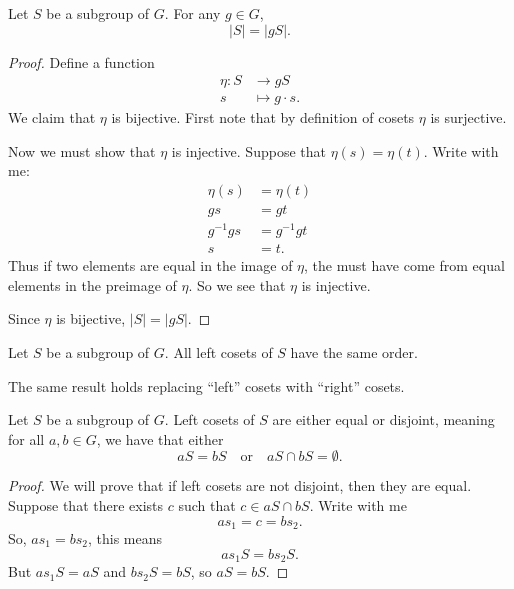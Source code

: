 \documentclass{ximera}
\begin{document}
\begin{lemma}\label{P:CSG}
  Let $S$ be a subgroup of $G$. For any $g\in G$,
  \[
  |S| = |gS|.
  \]
  \begin{proof}
    Define a function
    \begin{align*}
      \eta: S &\to g S\\
      s &\mapsto g\cdot s.
    \end{align*}
    We claim that $\eta$ is bijective. First note that by definition
    of cosets $\eta$ is surjective.

    Now we must show that $\eta$ is injective. Suppose that $\eta(s) =
    \eta(t)$. Write with me:
    \begin{align*}
      \eta(s) &= \eta(t) \\
      gs &= gt\\
      g^{-1} g s &= g^{-1} g t\\
      s &= t.
    \end{align*}
    Thus if two elements are equal in the image of $\eta$, the must
    have come from equal elements in the preimage of $\eta$. So we see
    that $\eta$ is injective.

    Since $\eta$ is bijective, $|S|= |gS|$.
  \end{proof}
\end{lemma}

\begin{corollary}
  Let $S$ be a subgroup of $G$. All left cosets of $S$ have the same
  order.
\end{corollary}

\begin{remark}
  The same result holds replacing ``left'' cosets with ``right''
  cosets.
\end{remark}



\begin{lemma}\label{L:cosetED}
  Let $S$ be a subgroup of $G$. Left cosets of $S$ are either equal or
  disjoint, meaning for all $a,b\in G$, we have that either
  \[
  aS = bS \quad\text{or}\quad aS \cap bS = \emptyset.
  \]
  \begin{proof}
    We will prove that if left cosets are not disjoint, then they are
    equal. Suppose that there exists $c$ such that $c\in aS \cap
    bS$. Write with me
    \[
    as_1 = c = bs_2.
    \]
    So, $as_1 = bs_2$, this means
    \[
    as_1 S = bs_2 S.
    \]
    But $as_1S = aS$ and $bs_2 S = bS$, so $aS = bS$.
  \end{proof}
\end{lemma}
\end{document}
